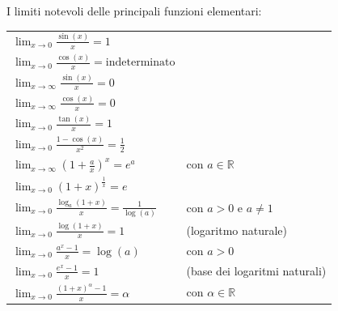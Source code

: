 \documentclass{book}
\begin{document}
\noindent\begin{minipage}{\textwidth}
    \begin{proposition}
        I limiti notevoli delle principali funzioni elementari:
        \begin{center}
            \renewcommand{\arraystretch}{2} %
            \begin{tabular}{l l}
                $\displaystyle \lim_{x \to 0} \frac{\sin(x)}{x} = 1$                       &                               \\
                $\displaystyle \lim_{x \to 0} \frac{\cos(x)}{x} = \text{indeterminato}$    &                               \\
                $\displaystyle \lim_{x \to \infty} \frac{\sin(x)}{x} = 0$                  &                               \\
                $\displaystyle \lim_{x \to \infty} \frac{\cos(x)}{x} = 0$                  &                               \\
                $\displaystyle \lim_{x \to 0} \frac{\tan(x)}{x} = 1$                       &                               \\
                $\displaystyle \lim_{x \to 0} \frac{1 - \cos(x)}{x^2} = \frac{1}{2}$       &                               \\
                $\displaystyle \lim_{x \to \infty} \left(1 + \frac{a}{x}\right)^x = e^a$   & con $a \in \mathbb{R}$        \\
                $\displaystyle \lim_{x \to 0} \left(1 + x\right)^{\frac{1}{x}} = e$        &                               \\
                $\displaystyle \lim_{x \to 0} \frac{\log_a(1 + x)}{x} = \frac{1}{\log(a)}$ & con $a > 0$ e $a \neq 1$      \\
                $\displaystyle \lim_{x \to 0} \frac{\log(1 + x)}{x} = 1$                   & (logaritmo naturale)          \\
                $\displaystyle \lim_{x \to 0} \frac{a^x - 1}{x} = \log(a)$                 & con $a > 0$                   \\
                $\displaystyle \lim_{x \to 0} \frac{e^x - 1}{x} = 1$                       & (base dei logaritmi naturali) \\
                $\displaystyle \lim_{x \to 0} \frac{(1 + x)^\alpha - 1}{x} = \alpha$       & con $\alpha \in \mathbb{R}$   \\
            \end{tabular}
        \end{center}
    \end{proposition}
\end{minipage}
\end{document}
